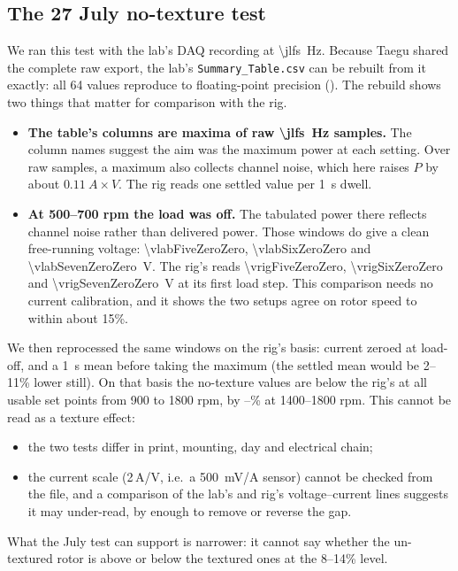 \documentclass[11pt]{article}
\begin{document}
\subsection{The 27 July no-texture test}
We ran this test with the lab's DAQ recording at \SI{\jlfs}{Hz}. Because Taegu shared the
complete raw export, the lab's \texttt{Summary\_Table.csv} can be rebuilt from it exactly: all
64 values reproduce to floating-point precision (). The rebuild shows two
things that matter for comparison with the rig.
\begin{itemize}
  \item \textbf{The table's columns are maxima of raw \SI{\jlfs}{Hz} samples.} The column names
        suggest the aim was the maximum power at each setting. Over raw samples, a maximum
        also collects channel noise, which here raises $P$ by about $\SI{0.11}{A}\times V$.
        The rig reads one settled value per \SI{1}{s} dwell.
  \item \textbf{At 500–700 rpm the load was off.} The tabulated power there reflects channel
        noise rather than delivered power. Those windows do give a clean free-running
        voltage: \SI{\vlabFiveZeroZero}{}, \SI{\vlabSixZeroZero}{} and
        \SI{\vlabSevenZeroZero}{V}. The rig's  reads \SI{\vrigFiveZeroZero}{},
        \SI{\vrigSixZeroZero}{} and \SI{\vrigSevenZeroZero}{V} at its first load step. This
        comparison needs no current calibration, and it shows the two setups agree on rotor
        speed to within about 15\%.
\end{itemize}

We then reprocessed the same windows on the rig's basis: current zeroed at load-off, and a
\SI{1}{s} mean before taking the maximum (the settled mean would be 2–11\% lower still). On that basis the no-texture values are below the
rig's  at all \jln{} usable set points from 900 to 1800 rpm, by \jlshortlo–\jlshorthi\%
at 1400–1800 rpm. This cannot be read as a texture effect:
\begin{itemize}
  \item the two tests differ in print, mounting, day and electrical chain;
  \item the current scale (2\,A/V, i.e.\ a \SI{500}{mV/A} sensor) cannot be checked from the
        file, and a comparison of the lab's and rig's voltage–current lines suggests it may
        under-read, by enough to remove or reverse the gap.
\end{itemize}
What the July test can support is narrower: it cannot say whether the un-textured rotor is
above or below the textured ones at the 8–14\% level.
\end{document}
